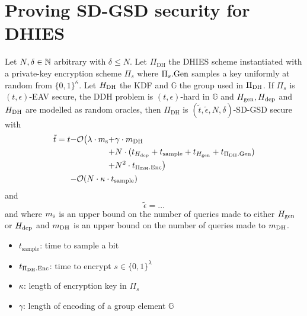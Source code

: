 \section{Proving SD-GSD security for DHIES}


\begin{theorem} \label{theorem:sdgsd-security}
	Let $N, \delta \in \mathbb{N}$ arbitrary with $\delta \le N$. Let $\Pi_{\mathrm{DH}}$ the DHIES scheme instantiated with a private-key encryption scheme $\Pi_s$ where $\Pi_s.\mathrm{Gen}$ samples a key uniformly at random from $\{0, 1\}^\kappa$. Let $H_\mathrm{DH}$ the KDF and $\mathbb{G}$ the group used in $\Pi_{\mathrm{DH}}$. If $\Pi_s$ is $(t, \epsilon)$-EAV secure, the DDH problem is $(t, \epsilon)$-hard in $\mathbb{G}$ and $H_\mathrm{gen}, H_\mathrm{dep}$ and $H_\mathrm{DH}$ are modelled as random oracles, then $\Pi_{\mathrm{DH}}$ is $(\tilde{t}, \tilde{\epsilon}, N, \delta)$-SD-GSD secure with
	\[
		\tilde{t} = t \begin{aligned}[t]
			- & \mathcal{O}\big(\lambda \cdot m_\mathrm{s}
			\begin{aligned}[t]
				+ & \gamma \cdot m_\mathrm{DH} \\ + & N \cdot (t_{H_\mathrm{dep}} + t_{\mathrm{sample}} + t_{H_\mathrm{gen}} + t_{\Pi_{\mathrm{DH}}.\mathrm{Gen}})  \\ + & N^2 \cdot t_{\Pi_{\mathrm{DH}}.\mathrm{Enc}}\big) \\
			\end{aligned} \\
			- & \mathcal{O}(N \cdot \kappa \cdot t_{\mathrm{sample}})
		\end{aligned}
	\]
	and
	\[
		\tilde{\epsilon} = \ldots
	\]
	and where $m_\mathrm{s}$ is an upper bound on the number of queries made to either $H_\mathrm{gen}$ or $H_\mathrm{dep}$ and $m_\mathrm{DH}$ is an upper bound on the number of queries made to $m_\mathrm{DH}$. 

	\begin{itemize}
		\item $t_{\mathrm{sample}}$: time to sample a bit
		\item $t_{\Pi_{\mathrm{DH}}.\mathrm{Enc}}$: time to encrypt $s \in \{0, 1\}^\lambda$
		\item $\kappa$: length of encryption key in $\Pi_s$
		\item $\gamma$: length of encoding of a group element $\mathbb{G}$
	\end{itemize}
\end{theorem}
